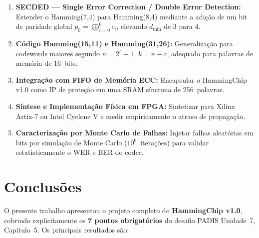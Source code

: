 \documentclass[12pt,a4paper]{article}
\begin{document}
\begin{enumerate}[leftmargin=2em,label=\textbf{TF\arabic*.}]
  \item \textbf{SECDED --- Single Error Correction / Double Error Detection:}
    Estender o Hamming(7,4) para Hamming(8,4) mediante a adição de um bit de paridade global $p_0 = \bigoplus_{i=0}^{6} c_i$, elevando $d_{\min}$ de 3 para 4.

  \item \textbf{Código Hamming(15,11) e Hamming(31,26):}
    Generalização para codewords maiores segundo $n = 2^r - 1$, $k = n - r$, adequado para palavras de memória de 16~bits.

  \item \textbf{Integração com FIFO de Memória ECC:}
    Encapsular o HammingChip v1.0 como IP de proteção em uma SRAM síncrona de 256~palavras.

  \item \textbf{Síntese e Implementação Física em FPGA:}
    Sintetizar para Xilinx Artix-7 ou Intel Cyclone V e medir empiricamente o atraso de propagação.

  \item \textbf{Caracterização por Monte Carlo de Falhas:}
    Injetar falhas aleatórias em bits por simulação de Monte Carlo ($10^6$~iterações) para validar estatisticamente o WER e BER do codec.
\end{enumerate}

\section{Conclusões}

O presente trabalho apresentou o projeto completo do \textbf{HammingChip v1.0}, cobrindo explicitamente os \textbf{7 pontos obrigatórios} do desafio PADIS Unidade~7, Capítulo~5. Os principais resultados são:
\end{document}

